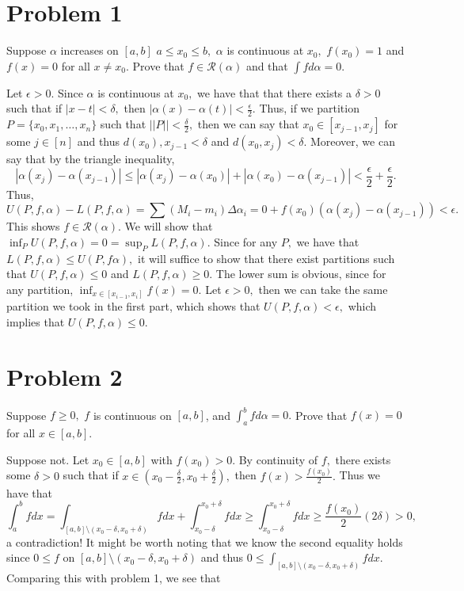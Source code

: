 \documentclass[11pt]{article}
\begin{document}
	
	
	\psetheader

\section*{Problem 1}
\begin{problem}
Suppose $\alpha$ increases on $[a,b]$ $a \leq x_0 \leq b,$ $\alpha$ is continuous at $x_0,$ $f(x_0) = 1$ and $f(x) = 0$ for all $x\neq x_0.$ Prove that $f\in \mathcal{R}(\alpha)$ and that $\int f d\alpha =0.$
\end{problem}
\begin{solution}
Let $\epsilon>0.$ Since $\alpha$ is continuous at $x_0,$ we have that that there exists a $\delta>0$ such that if $|x-t|< \delta,$ then $|\alpha(x) - \alpha(t)|< \frac{\epsilon}{2}.$ Thus, if we partition $P = \{x_0, x_1, \dots, x_n \}$ such that $||P||< \frac{\delta}{2},$ then we can say that $x_0 \in [x_{j-1}, x_j]$ for some $j \in [n]$ and thus $d(x_0), x_{j-1}< \delta$ and $d(x_0, x_j)< \delta.$ Moreover, we can say that by the triangle inequality, 
\[|\alpha(x_j) - \alpha(x_{j-1})| \leq |\alpha(x_j) - \alpha(x_0)| + |\alpha(x_0) - \alpha(x_{j-1})|< \frac{\epsilon}{2} + \frac{\epsilon}{2}.\]
Thus,
\[U(P,f, \alpha) -L(P, f, \alpha) = \sum (M_i - m_i)\Delta \alpha_i = 0 + f(x_0)(\alpha(x_j) - \alpha(x_{j-1})) < \epsilon.\] This shows $f \in \mathcal{R}(\alpha).$
We will show that $\inf_P U(P,f,\alpha) = 0 = \sup_P L(P,f,\alpha).$ Since for any $P,$ we have that $L(P,f,\alpha) \leq U(P,f\alpha),$ it will suffice to show that there exist partitions such that $U(P,f,\alpha)\leq 0$ and $L(P,f, \alpha)\geq 0.$ The lower sum is obvious, since for any partition, $\inf_{x\in [x_{i-1}, x_i]}f(x) = 0.$ Let $\epsilon>0,$ then we can take the same partition we took in the first part, which shows that $U(P,f,\alpha) < \epsilon,$ which implies that $U(P,f,\alpha)\leq 0.$
\end{solution}

\newpage
\section*{Problem 2}
\begin{problem}
Suppose $f\geq 0,$ $f$ is continuous on $[a,b]$, and $\int_a^b f d\alpha = 0.$ Prove that $f(x) = 0$ for all $x\in [a,b].$
\end{problem}
\begin{solution}
    Suppose not. Let $x_0 \in [a,b]$ with $f(x_0) > 0 $. By continuity of $f,$ there exists some $\delta>0$ such that if $x\in (x_0 - \frac{\delta}{2}, x_0 + \frac{\delta}{2}),$ then $f(x) > \frac{f(x_0)}{2}.$ Thus we have that 
    \[\int_a^b fdx = \int_{[a,b]\setminus(x_0 - \delta, x_0 + \delta)}f dx + \int_{x_0-\delta}^ {x_0 + \delta}f dx\geq \int_{x_0-\delta}^ {x_0 + \delta}f dx \geq \frac{f(x_0)}{2}(2\delta) > 0,\] a contradiction! It might be worth noting that we know the second equality holds since $0\leq f$ on $[a,b]\setminus(x_0 - \delta, x_0 + \delta)$ and thus $0 \leq \int_{[a,b]\setminus(x_0 - \delta, x_0 + \delta)}f dx.$ Comparing this with problem 1, we see that 
\end{solution}
\end{document}
